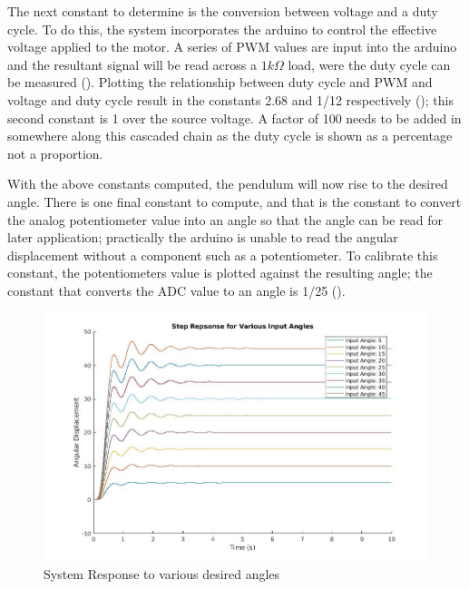 \documentclass[a4paper, 11pt, compsoc]{IEEEtran}
\begin{document}
		The next constant to determine is the conversion between voltage and a duty cycle. To do this, the system incorporates the arduino to control the effective voltage applied to the motor. A series of PWM values are input into the arduino and the resultant signal will be read across a $1k\Omega$ load, were the duty cycle can be measured (). Plotting the relationship between duty cycle and PWM and voltage and duty cycle result in the constants 2.68 and 1/12 respectively (); this second constant is 1 over the source voltage. A factor of 100 needs to be added in somewhere along this cascaded chain as the duty cycle is shown as a percentage not a proportion.
		\par
		With the above constants computed, the pendulum will now rise to the desired angle. There is one final constant to compute, and that is the constant to convert the analog potentiometer value into an angle so that the angle can be read for later application; practically the arduino is unable to read the angular displacement without a component such as a potentiometer. To calibrate this constant, the potentiometers value is plotted against the resulting angle; the constant that converts the ADC value to an angle is 1/25 ().
		\begin{figure}[!ht]
			\centering
			\includegraphics[width=\columnwidth]{lab4Input.jpg}
			\caption{System Response to various desired angles}
			\label{fig:lab4Output}
		\end{figure}
\end{document}
